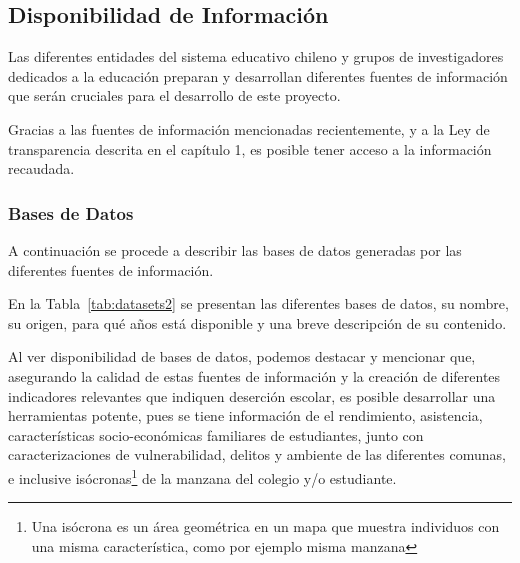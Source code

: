 \subsection{Disponibilidad de Información}
Las diferentes entidades del sistema educativo chileno y grupos de investigadores dedicados a la educación preparan y desarrollan diferentes fuentes de información que serán cruciales para el desarrollo de este proyecto.

Gracias a las fuentes de información mencionadas recientemente, y a la Ley de transparencia descrita en el capítulo 1, es posible tener acceso a la información recaudada.

\subsubsection{Bases de Datos}
A continuación se procede a describir las bases de datos generadas por las diferentes fuentes de información. 

En la Tabla~\ref{tab:datasets2} se presentan las diferentes bases de datos, su nombre, su origen, para qué años está disponible y una breve descripción de su contenido.

Al ver disponibilidad de bases de datos, podemos destacar y mencionar que, asegurando la calidad de estas fuentes de información y la creación de diferentes indicadores relevantes que indiquen deserción escolar, es posible desarrollar una herramientas potente, pues se tiene información de el rendimiento, asistencia, características socio-económicas familiares de estudiantes, junto con caracterizaciones de vulnerabilidad, delitos y ambiente de las diferentes comunas, e inclusive isócronas\footnote{Una isócrona es un área geométrica en un mapa que muestra individuos con una misma característica, como por ejemplo misma manzana} de la manzana del colegio y/o estudiante.

